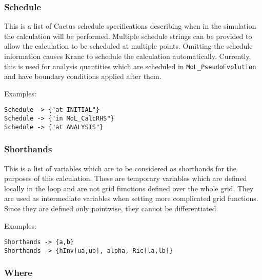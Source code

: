 \documentclass{report}
\begin{document}
\subsubsection{Schedule}

This is a list of Cactus schedule specifications describing when in
the simulation the calculation will be performed.  Multiple schedule
strings can be provided to allow the calculation to be scheduled at
multiple points.  Omitting the schedule information causes Kranc to
schedule the calculation automatically.  Currently, this is used for
analysis quantities which are scheduled in \verb|MoL_PseudoEvolution|
and have boundary conditions applied after them.

Examples:

\begin{center}
\begin{minipage}{0.8 \textwidth}
\begin{verbatim}
Schedule -> {"at INITIAL"}
Schedule -> {"in MoL_CalcRHS"}
Schedule -> {"at ANALYSIS"}
\end{verbatim}
\end{minipage}
\end{center}

\subsubsection{Shorthands}

This is a list of variables which are to be considered as shorthands
for the purposes of this calculation.  These are temporary variables
which are defined locally in the loop and are not grid functions
defined over the whole grid.  They are used as intermediate variables
when setting more complicated grid functions.  Since they are defined
only pointwise, they cannot be differentiated.

Examples:

\begin{center}
\begin{minipage}{0.8 \textwidth}
\begin{verbatim}
Shorthands -> {a,b}
Shorthands -> {hInv[ua,ub], alpha, Ric[la,lb]}
\end{verbatim}
\end{minipage}
\end{center}

\subsubsection{Where}
\end{document}
